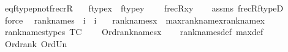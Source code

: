 \begin{isabellebody}
\endisatagML
{\isafoldML}%
%
\isadelimML
\isanewline
%
\endisadelimML
\isanewline
\isanewline
{}\isamarkupfalse%
\ eq{\isacharunderscore}{\kern0pt}ftypep{\isacharunderscore}{\kern0pt}not{\isacharunderscore}{\kern0pt}frecrR{\isacharcolon}{\kern0pt}\isanewline
\ \ \ {\isachardoublequoteopen}ftype{\isacharparenleft}{\kern0pt}x{\isacharparenright}{\kern0pt}\ {\isacharequal}{\kern0pt}\ ftype{\isacharparenleft}{\kern0pt}y{\isacharparenright}{\kern0pt}{\isachardoublequoteclose}\isanewline
\ \ \ {\isachardoublequoteopen}{\isasymnot}\ frecR{\isacharparenleft}{\kern0pt}x{\isacharcomma}{\kern0pt}y{\isacharparenright}{\kern0pt}{\isachardoublequoteclose}\isanewline
%
\isadelimproof
\ \ %
\endisadelimproof
%
\isatagproof
{}\isamarkupfalse%
\ assms\ frecR{\isacharunderscore}{\kern0pt}ftypeD\ \isamarkupfalse%
\ force%
\endisatagproof
{\isafoldproof}%
%
\isadelimproof
\isanewline
%
\endisadelimproof
\isanewline
\isanewline
{}\isamarkupfalse%
\isanewline
\ \ rank{\isacharunderscore}{\kern0pt}names\ {\isacharcolon}{\kern0pt}{\isacharcolon}{\kern0pt}\ {\isachardoublequoteopen}i\ {\isasymRightarrow}\ i{\isachardoublequoteclose}\ \isanewline
\ \ {\isachardoublequoteopen}rank{\isacharunderscore}{\kern0pt}names{\isacharparenleft}{\kern0pt}x{\isacharparenright}{\kern0pt}\ {\isasymequiv}\ max{\isacharparenleft}{\kern0pt}rank{\isacharparenleft}{\kern0pt}name{}{\isacharparenleft}{\kern0pt}x{\isacharparenright}{\kern0pt}{\isacharparenright}{\kern0pt}{\isacharcomma}{\kern0pt}rank{\isacharparenleft}{\kern0pt}name{}{\isacharparenleft}{\kern0pt}x{\isacharparenright}{\kern0pt}{\isacharparenright}{\kern0pt}{\isacharparenright}{\kern0pt}{\isachardoublequoteclose}\isanewline
\isanewline
{}\isamarkupfalse%
\ rank{\isacharunderscore}{\kern0pt}names{\isacharunderscore}{\kern0pt}types\ {\isacharbrackleft}{\kern0pt}TC{\isacharbrackright}{\kern0pt}{\isacharcolon}{\kern0pt}\ \isanewline
\ \ \ {\isachardoublequoteopen}Ord{\isacharparenleft}{\kern0pt}rank{\isacharunderscore}{\kern0pt}names{\isacharparenleft}{\kern0pt}x{\isacharparenright}{\kern0pt}{\isacharparenright}{\kern0pt}{\isachardoublequoteclose}\isanewline
%
\isadelimproof
\ \ %
\endisadelimproof
%
\isatagproof
{}\isamarkupfalse%
\ rank{\isacharunderscore}{\kern0pt}names{\isacharunderscore}{\kern0pt}def\ max{\isacharunderscore}{\kern0pt}def\ \isamarkupfalse%
\ Ord{\isacharunderscore}{\kern0pt}rank\ Ord{\isacharunderscore}{\kern0pt}Un\ \isamarkupfalse%

\end{isabellebody}
